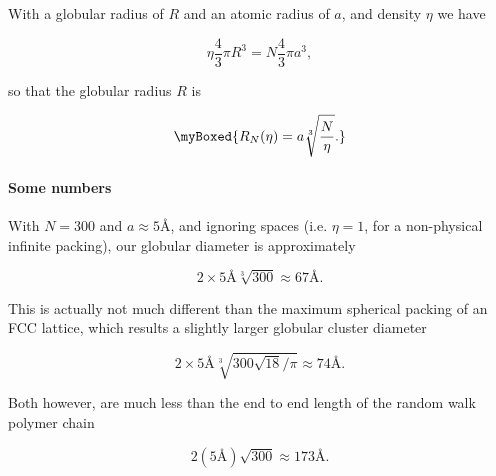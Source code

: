 {With a globular radius of $R$ and an atomic radius of $a$, and density $\eta$ we have

\begin{equation}\label{eqn:basicStatMechProblemSet3Problem2:200}
\eta \frac{4}{3} \pi R^3 = N \frac{4}{3} \pi a^3,
\end{equation}

so that the globular radius $R$ is 

\begin{equation}\label{eqn:basicStatMechProblemSet3Problem2:180}
\myBoxed{
R_N(\eta) = a \sqrt[3]{\frac{N}{\eta}}.
}
\end{equation}

\paragraph{Some numbers}

With $N = 300$ and $a \approx 5 \text{\AA}$, and ignoring spaces (i.e. $\eta = 1$, for a non-physical infinite packing), our globular diameter is approximately

\begin{equation}\label{eqn:basicStatMechProblemSet3Problem2:240}
2 \times 5 \text{\AA} \sqrt[3]{300} \approx 67 \text{\AA}.
\end{equation}

This is actually not much different than the maximum spherical packing of an FCC lattice, which results a slightly larger globular cluster diameter

\begin{equation}\label{eqn:basicStatMechProblemSet3Problem2:260}
2 \times 5 \text{\AA} \sqrt[3]{300 \sqrt{18}/\pi} \approx 74 \text{\AA}.
\end{equation}

Both however, are much less than the end to end length of the random walk polymer chain

\begin{equation}\label{eqn:basicStatMechProblemSet3Problem2:220}
2 (5 \text{\AA}) \sqrt{300} \approx 173 \text{\AA}.
\end{equation}
}
